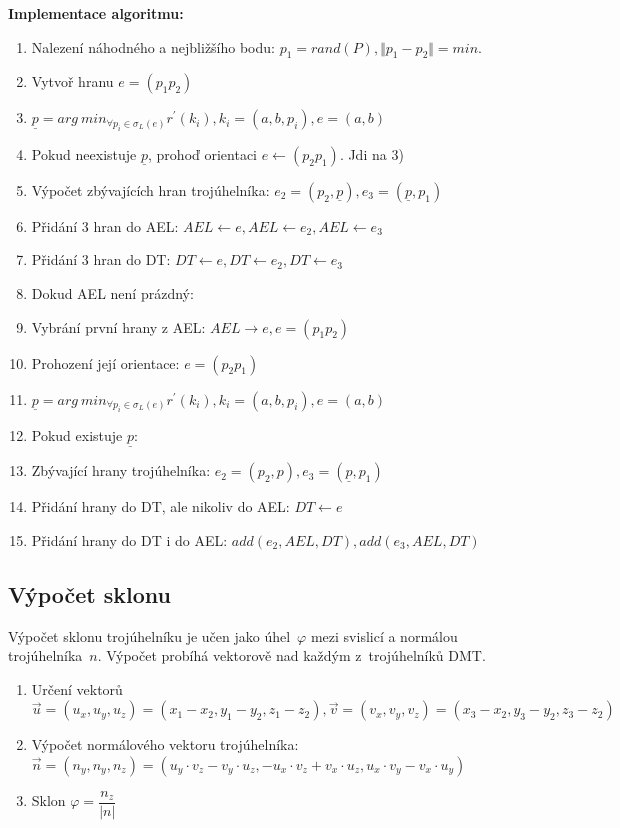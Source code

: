 \documentclass[a4paper, 12pt, oneside, titlepage]{article} %
\begin{document}
\textbf{Implementace algoritmu:} 
\begin{enumerate}
\item Nalezení náhodného a nejbližšího bodu: $p_1=rand(P), \Vert{p_1-p_2}\Vert=min.$
\item Vytvoř hranu $e=(p_1p_2)$
\item $\underline{p}=arg~min_{\forall p_i\in \sigma_L (e)}r^{'}(k_i),k_i=(a,b,p_i),e=(a,b)$
\item Pokud neexistuje $\underline{p}$, prohoď orientaci $e \leftarrow (p_2p_1)$. Jdi na 3)
\item Výpočet zbývajících hran trojúhelníka: $e_2=(p_2,\underline{p}),e_3=(\underline{p},p_1)$
\item Přidání 3 hran do AEL: $AEL \leftarrow e, AEL \leftarrow e_2, AEL \leftarrow e_3$
\item Přidání 3 hran do DT: $DT \leftarrow e, DT \leftarrow e_2, DT \leftarrow e_3$
\item Dokud AEL není prázdný:
\item \quad Vybrání první hrany z AEL: $AEL \rightarrow e, e=(p_1p_2)$
\item \quad Prohození její orientace: $e=(p_2p_1)$
\item \quad $\underline{p}=arg~min_{\forall p_i\in \sigma_L (e)}r^{'}(k_i),k_i=(a,b,p_i),e=(a,b)$
\item \quad Pokud existuje $\underline{p}$:
\item \quad \quad Zbývající hrany trojúhelníka: $e_2=(p_2,p),e_3=(\underline{p},p_1)$
\item \quad \quad Přidání hrany do DT, ale nikoliv do AEL: $DT \leftarrow e$
\item \quad \quad Přidání hrany do DT i do AEL: $add(e_2,AEL,DT), add(e_3,AEL,DT)$
\end{enumerate}

\subsection{Výpočet sklonu}\label{vyp_sklon}
Výpočet sklonu trojúhelníku je učen jako úhel~$\varphi$ mezi svislicí a normálou trojúhelníka~$n$. Výpočet probíhá vektorově nad každým z~trojúhelníků DMT. 

\begin{enumerate}
\item Určení vektorů $\overrightarrow{u}=(u_x,u_y,u_z)=(x_1-x_2, y_1-y_2, z_1-z_2), \overrightarrow{v}=(v_x,v_y,v_z)=(x_3-x_2,y_3-y_2,z_3-z_2)$ 
\item Výpočet normálového vektoru trojúhelníka: $\overrightarrow{n}=(n_y,n_y,n_z)=(u_y \cdot v_z-v_y \cdot u_z,-u_x \cdot v_z+v_x \cdot u_z,u_x \cdot v_y-v_x \cdot u_y)$
\item Sklon $\varphi =\dfrac{n_z}{\vert n\vert}$
\end{enumerate}
\end{document}
